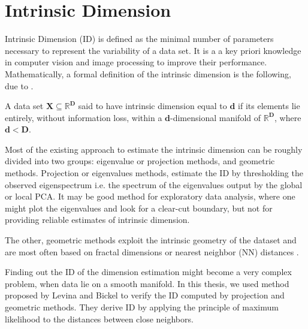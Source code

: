 \section{Intrinsic Dimension}
\label{s:id}

Intrinsic Dimension (ID) is defined as the minimal number of parameters necessary to represent the variability of a data set. It is a a key priori
knowledge in computer vision and image processing to improve their performance. Mathematically, a formal definition of the intrinsic dimension is the following, due to \citep{Cama2016}.

\begin{definition}
A data set $\mathbf{X}\subseteq \mathbb{R}^{\mathbf{D}}$ said to have intrinsic dimension equal to $\mathbf{d}$  if its elements lie entirely, without information loss, within a $\mathbf{d}$-dimensional manifold of $\mathbb{R}^{\mathbf{D}}$, where $\mathbf{d} < \mathbf{D}$.
\end{definition}

Most of the existing approach to estimate the intrinsic dimension can be roughly divided into two groups: eigenvalue or projection methods, and geometric methods. Projection or eigenvalues methods, estimate the ID by thresholding the observed eigenspectrum i.e. the spectrum of the eigenvalues output by the global or local PCA. It may be good method for exploratory
data analysis, where one might plot the eigenvalues and look for a clear-cut boundary, but not for providing reliable estimates of intrinsic dimension.

The other, geometric methods exploit the intrinsic geometry of the dataset and are most often based on fractal dimensions or nearest neighbor (NN) distances \citep{Lev2005}.

Finding out the ID of the dimension estimation might become a very complex problem, when data lie on a smooth manifold. In this thesis, we used method proposed by Levina and Bickel \citep{Lev2005} to verify the ID computed by projection and geometric methods. They derive ID by applying the principle of maximum likelihood to the distances between close neighbors. 
